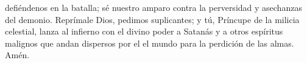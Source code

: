 defiéndenos en la batalla; sé nuestro amparo contra la perversidad y asechanzas del demonio. Reprímale Dios, pedimos
suplicantes; y tú, Príncupe de la milicia celestial, lanza al infierno con el divino poder a Satanás y a otros espíritus malignos que andan dispersos por el
el mundo para la perdición de las almas. Amén.